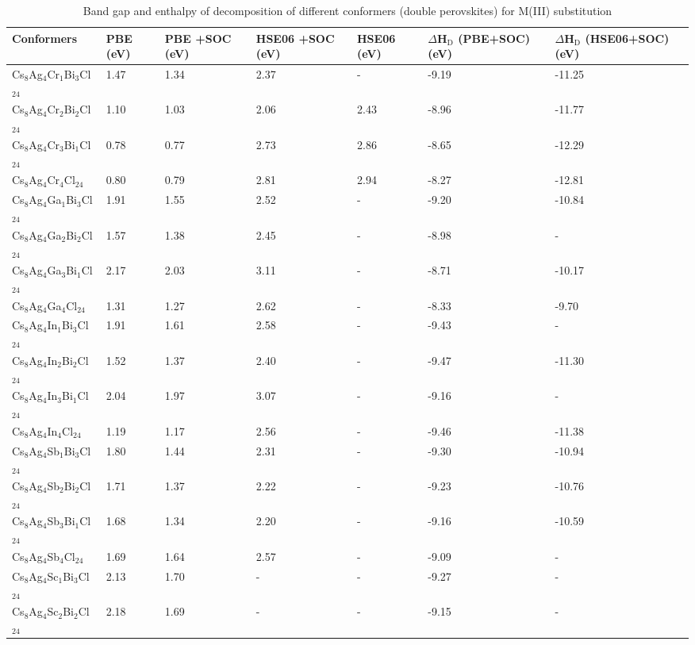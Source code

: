 \documentclass[journal=jpclcd,manuscript=letter]{achemso}
\begin{document}
\begin{table}
\caption{Band gap and enthalpy of decomposition of different conformers (double perovskites) for M(III) substitution}
\centering
\begin{tabular}{p{3.8cm} p{1.2cm}p{1.2cm}p{1.2cm}p{1.2cm}p{2.2cm}p{2.4cm}} \hline
	Conformers & PBE (eV)& PBE +SOC (eV) & HSE06 +SOC (eV)& HSE06 (eV)& $\Delta$H$_{\textrm{D}}$ (PBE+SOC) (eV) &$\Delta$H$_{\textrm{D}}$ (HSE06+SOC) (eV)\\ \hline
	Cs$_8$Ag$_4$Cr$_{1}$Bi$_{3}$Cl$_{24}$&1.47&1.34&2.37&-&-9.19&	-11.25
	\\ \hline
	Cs$_8$Ag$_4$Cr$_{2}$Bi$_{2}$Cl$_{24}$&1.10&1.03&2.06&2.43& -8.96&	-11.77
	\\ \hline
	Cs$_8$Ag$_4$Cr$_{3}$Bi$_{1}$Cl$_{24}$&0.78&0.77&2.73&2.86&-8.65 &-12.29
	\\ \hline
	Cs$_8$Ag$_4$Cr$_4$Cl$_{24}$ &0.80&0.79&2.81&2.94&-8.27&-12.81\\ \hline
	Cs$_8$Ag$_4$Ga$_{1}$Bi$_{3}$Cl$_{24}$&1.91&1.55&2.52&-& -9.20&	-10.84
	\\ \hline
	Cs$_8$Ag$_4$Ga$_{2}$Bi$_{2}$Cl$_{24}$&1.57&1.38&2.45&-& -8.98
	&-\\ \hline
	Cs$_8$Ag$_4$Ga$_{3}$Bi$_{1}$Cl$_{24}$& 2.17&2.03&3.11&-& -8.71&	-10.17
	\\ \hline
	Cs$_8$Ag$_4$Ga$_4$Cl$_{24}$&1.31&1.27&2.62&-&-8.33&-9.70\\ \hline
	Cs$_8$Ag$_4$In$_{1}$Bi$_{3}$Cl$_{24}$&1.91&1.61&2.58&-& -9.43&-\\ \hline
	Cs$_8$Ag$_4$In$_{2}$Bi$_{2}$Cl$_{24}$&1.52&1.37&2.40&-& -9.47&	-11.30\\ \hline
	Cs$_8$Ag$_4$In$_{3}$Bi$_{1}$Cl$_{24}$&2.04&1.97&3.07&-& -9.16&-
	\\ \hline
	Cs$_8$Ag$_4$In$_4$Cl$_{24}$&1.19&1.17&2.56&-&-9.46&-11.38\\ \hline
	Cs$_8$Ag$_4$Sb$_{1}$Bi$_{3}$Cl$_{24}$&1.80&1.44&2.31&-& -9.30&-10.94
	\\ \hline
	Cs$_8$Ag$_4$Sb$_{2}$Bi$_{2}$Cl$_{24}$&1.71&1.37&2.22&-& -9.23&-10.76
	\\ \hline
	Cs$_8$Ag$_4$Sb$_{3}$Bi$_{1}$Cl$_{24}$&1.68&1.34&2.20&-& -9.16&	-10.59\\ \hline
	Cs$_8$Ag$_4$Sb$_4$Cl$_{24}$&1.69&1.64&2.57&-& -9.09&-\\ \hline
	Cs$_8$Ag$_4$Sc$_{1}$Bi$_{3}$Cl$_{24}$&2.13&1.70&-&-& -9.27&-\\ \hline
	Cs$_8$Ag$_4$Sc$_{2}$Bi$_{2}$Cl$_{24}$&2.18&1.69&-&-& -9.15&-\\ \hline

\end{tabular}
\end{table}
\end{document}
